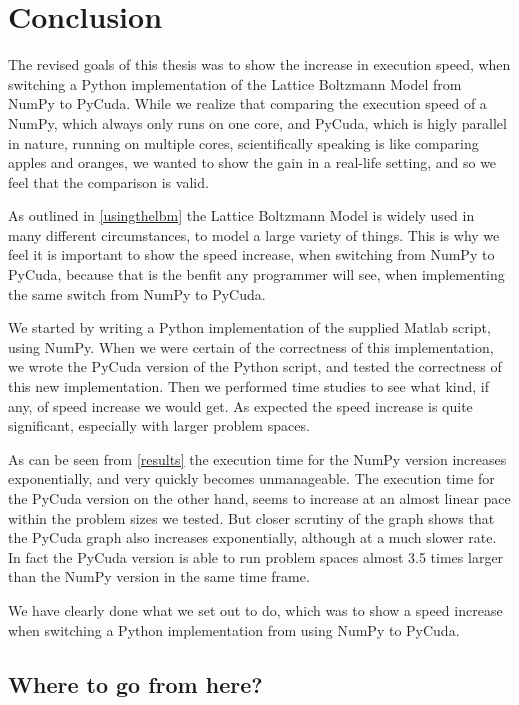 \section{Conclusion}

The revised goals of this thesis was to show the increase in execution speed, when switching a Python implementation of the Lattice Boltzmann Model from NumPy to PyCuda. While we realize that comparing the execution speed of a NumPy, which always only runs on one core, and PyCuda, which is higly parallel in nature, running on multiple cores, scientifically speaking is like comparing apples and oranges, we wanted to show the gain in a real-life setting, and so we feel that the comparison is valid.

As outlined in \autoref{usingthelbm} the Lattice Boltzmann Model is widely used in many different circumstances, to model a large variety of things. This is why we feel it is important to show the speed increase, when switching from NumPy to PyCuda, because that is the benfit any programmer will see, when implementing the same switch from NumPy to PyCuda.

We started by writing a Python implementation of the supplied Matlab script, using NumPy. When we were certain of the correctness of this implementation, we wrote the PyCuda version of the Python script, and tested the correctness of this new implementation. Then we performed time studies to see what kind, if any, of speed increase we would get. As expected the speed increase is quite significant, especially with larger problem spaces.

As can be seen from \autoref{results} the execution time for the NumPy version increases exponentially, and very quickly becomes unmanageable. The execution time for the PyCuda version on the other hand, seems to increase at an almost linear pace within the problem sizes we tested. But closer scrutiny of the graph shows that the PyCuda graph also increases exponentially, although at a much slower rate. In fact the PyCuda version is able to run problem spaces almost 3.5 times larger than the NumPy version in the same time frame.

We have clearly done what we set out to do, which was to show a speed increase when switching a Python implementation from using NumPy to PyCuda.

\subsection{Where to go from here?}

